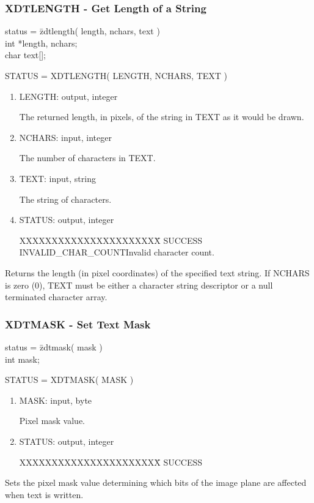 \subsubsection{XDTLENGTH - Get Length of a String}
\begin{tabbing}
status = \=zdtlength( length, nchars, text )\\
\>int  *length, nchars;\\
\>char  text[];\\
\end{tabbing}
STATUS = XDTLENGTH( LENGTH, NCHARS, TEXT )
\begin{enumerate}
\item LENGTH:  output, integer

The returned length, in pixels, of the string in TEXT as it would be
drawn.
\item NCHARS:  input, integer

The number of characters in TEXT.
\item TEXT:  input, string

The string of characters.
\item STATUS:  output, integer
\begin{tabbing}
XXXXXXXXXXXXXXXXXXXXXX\=\kill
SUCCESS\\
INVALID\_CHAR\_COUNT\>Invalid character count.\\
\end{tabbing}
\end{enumerate}
Returns the length (in pixel coordinates) of the specified text
string.  If NCHARS is zero (0), TEXT must be either a character
string descriptor or a null terminated character array.
\newpage
\subsubsection{XDTMASK - Set Text Mask}
\begin{tabbing}
status = \=zdtmask( mask )\\
\>int  mask;\\
\end{tabbing}
STATUS = XDTMASK( MASK )
\begin{enumerate}
\item MASK:  input, byte

Pixel mask value.
\item STATUS:  output, integer
\begin{tabbing}
XXXXXXXXXXXXXXXXXXXXXX\=\kill
SUCCESS\\
\end{tabbing}
\end{enumerate}
Sets the pixel mask value determining which bits of the image plane are
affected when text is written.
\newpage
